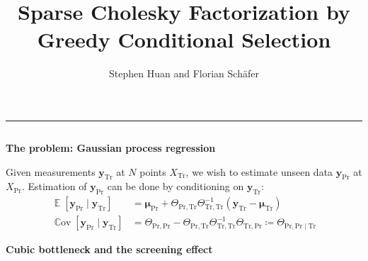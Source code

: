 \documentclass{beamer}                             %
\title[]{\Huge Sparse Cholesky Factorization by \\
Greedy Conditional Selection}
\subtitle{}
\author[Huan]{\LARGE Stephen Huan and Florian Sch{\"a}fer}
\date[]{}
\newcommand{\blocktitle}[1]{{\Large \textbf{#1}}}
\renewcommand{\vec}[1]{\bm{#1}}
\newcommand*{\defeq}{\coloneqq}
\newcommand*{\CM}{\Theta}
\newcommand*{\Train}{\mathrm{Tr}}
\newcommand*{\Pred}{\mathrm{Pr}}
\DeclareMathOperator{\E}{\mathbb{E}}
\DeclareMathOperator{\Cov}{\mathbb{C}ov}
\begin{document}
\begin{frame}[t]
\titlepage



\vspace{-8cm}

\begin{center}
  \textcolor{darksilver}{\rule{\textwidth}{2mm}}
\end{center}

\begin{columns}[T]


\begin{column}{0.30\textwidth}
  \begin{tcolorbox}
    \blocktitle{The problem: Gaussian process regression}

    Given measurements \( \vec{y}_\Train \) at \( N \) points \(
    X_\Train \), we wish to estimate unseen data \( \vec{y}_\Pred
    \) at \( X_\Pred \). Estimation of \( \vec{y}_\Pred \) can
    be done by conditioning on \( \vec{y}_\Train \):
    \begin{align*}
      \E[\vec{y}_\Pred \mid \vec{y}_\Train] &=
        \vec{\mu}_\Pred +
        \CM_{\Pred, \Train} \CM_{\Train, \Train}^{-1}
        (\vec{y}_\Train - \vec{\mu}_\Train) \\
      \Cov[\vec{y}_\Pred \mid \vec{y}_\Train] &=
        \CM_{\Pred, \Pred} -
        \CM_{\Pred, \Train} \CM_{\Train, \Train}^{-1}
        \CM_{\Train, \Pred}
      \defeq \CM_{\Pred, \Pred \mid \Train}
    \end{align*}
  \end{tcolorbox}

  \begin{tcolorbox}
    \blocktitle{Cubic bottleneck and the screening effect}


\end{tcolorbox}
\end{column}
\end{columns}
\end{frame}
\end{document}
